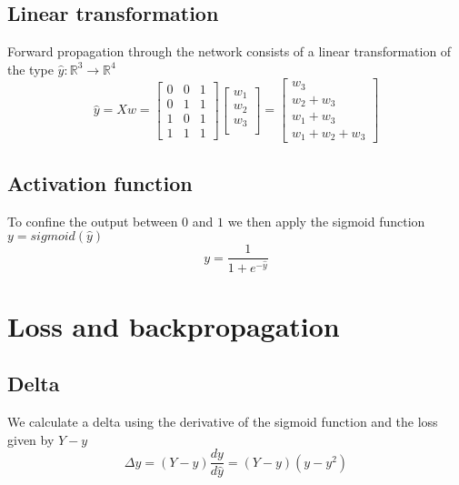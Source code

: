 \documentclass[10pt,a4paper]{article}
\begin{document}
\subsection{Linear transformation}
Forward propagation through the network consists of a linear transformation of the type $\hat{y}: \mathbb{R}^3 \to \mathbb{R}^4$
\begin{equation}
	\hat{y} = Xw =
	\begin{bmatrix}
		0 & 0 & 1 \\
		0 & 1 & 1 \\
		1 & 0 & 1 \\
		1 & 1 & 1
	\end{bmatrix}
	\begin{bmatrix}
		w_1 \\
		w_2 \\
		w_3 \\
	\end{bmatrix}
	=
	\begin{bmatrix}
		w_3 \\
		w_2 + w_3 \\
		w_1 + w_3 \\
		w_1 + w_2 + w_3
	\end{bmatrix}
\end{equation}
\subsection{Activation function}
To confine the output between $0$ and $1$ we then apply the sigmoid function $y = sigmoid(\hat{y})$
\begin{equation}
	y = \frac{1}{1+e^{-\hat{y}}}
\end{equation}

\newpage

\section{Loss and backpropagation}
\subsection{Delta}
We calculate a delta using the derivative of the sigmoid function and the loss given by $Y-y$
\begin{equation}
	\Delta{y} = (Y-y)\frac{dy}{d\hat{y}} = (Y-y)(y-y^2)
\end{equation}
\end{document}
